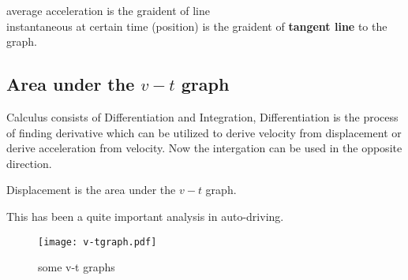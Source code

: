 \documentclass[a4paper]{tufte-handout}
\newenvironment{SummBox}
{\begin{tcolorbox}[breakable,colback=r1!30,colframe=r1,title=Summary]} {\end{tcolorbox}}
\begin{document}
\begin{SummBox}
average acceleration is the graident of line \uline{\hfill}\\
instantaneous \uline{\hspace{0.5 in}} at certain time (position) is the graident of \textbf{tangent line} to the \uline{\hspace{0.5 in}} graph.
\end{SummBox}


\subsection{Area under the $v-t$ graph}
Calculus consists of Differentiation and Integration, Differentiation is the process of finding derivative which can be utilized to derive velocity from displacement or derive acceleration from velocity. Now the intergation can be used in the opposite direction.
\begin{SummBox}
Displacement is the area under the $v-t$ graph.
\end{SummBox}
This has been a quite important analysis in auto-driving.
\begin{figure*}[h]
\texttt{[image: v-tgraph.pdf]}
\caption{some v-t graphs}
\end{figure*}
\end{document}
